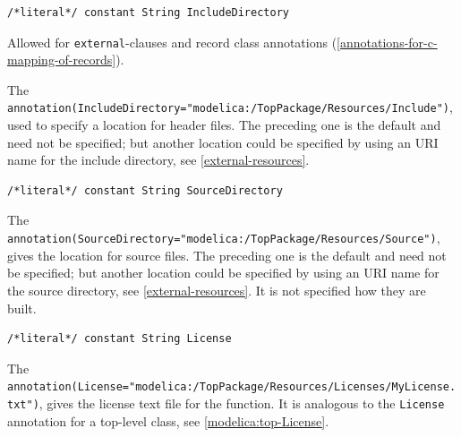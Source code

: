 \begin{annotationdefinition}[IncludeDirectory]
\begin{synopsis}\begin{lstlisting}
/*literal*/ constant String IncludeDirectory
\end{lstlisting}\end{synopsis}
\begin{semantics}
Allowed for \lstinline!external!-clauses and record class annotations (\cref{annotations-for-c-mapping-of-records}).

The {\lstinline!annotation(IncludeDirectory="modelica:/TopPackage/Resources/Include")!}, used to specify a location for header files.
The preceding one is the default and need not be specified; but another location could be specified by using an URI name for the include directory, see \cref{external-resources}.
\end{semantics}
\end{annotationdefinition}

\begin{annotationdefinition}[SourceDirectory]
\begin{synopsis}\begin{lstlisting}
/*literal*/ constant String SourceDirectory
\end{lstlisting}\end{synopsis}
\begin{semantics}
The {\lstinline!annotation(SourceDirectory="modelica:/TopPackage/Resources/Source")!}, gives the location for source files.
The preceding one is the default and need not be specified; but another location could be specified by using an URI name for the source directory, see \cref{external-resources}.
It is not specified how they are built.
\end{semantics}
\end{annotationdefinition}

\begin{annotationdefinition*}[License]\label{modelica:extfun-License}
\begin{synopsis}\begin{lstlisting}
/*literal*/ constant String License
\end{lstlisting}\end{synopsis}
\begin{semantics}
The {\lstinline!annotation(License="modelica:/TopPackage/Resources/Licenses/MyLicense.txt")!}, gives the license text file for the function.
It is analogous to the \lstinline!License! annotation for a top-level class, see \cref{modelica:top-License}.
\end{semantics}
\end{annotationdefinition*}


